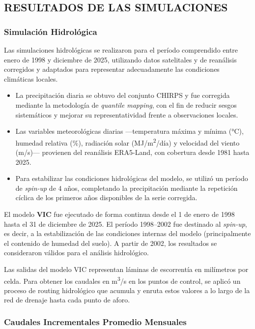 \subsection{RESULTADOS DE LAS SIMULACIONES}

\subsubsection{Simulación Hidrológica}
Las simulaciones hidrológicas se realizaron para el período comprendido entre
enero de 1998 y diciembre de 2025, utilizando datos satelitales y de reanálisis
corregidos y adaptados para representar adecuadamente las condiciones climáticas
locales.

\begin{itemize}[leftmargin=1.5em]
    \item La precipitación diaria se obtuvo del conjunto CHIRPS y fue corregida
    mediante la metodología de \textit{quantile mapping}, con el fin de reducir
    sesgos sistemáticos y mejorar su representatividad frente a observaciones
    locales.
    \item Las variables meteorológicas diarias —temperatura máxima y mínima
    (°C), humedad relativa (\%), radiación solar (MJ/m\textsuperscript{2}/día) y
    velocidad del viento (m/s)— provienen del reanálisis ERA5-Land, con
    cobertura desde 1981 hasta 2025.
    \item Para estabilizar las condiciones hidrológicas del modelo, se utilizó
    un período de \textit{spin-up} de 4 años, completando la precipitación
    mediante la repetición cíclica de los primeros años disponibles de la serie
    corregida.
\end{itemize}

El modelo \textbf{VIC} fue ejecutado de forma continua desde el 1 de enero de
1998 hasta el 31 de diciembre de 2025. El período 1998--2002 fue destinado al
\textit{spin-up}, es decir, a la estabilización de las condiciones internas del
modelo (principalmente el contenido de humedad del suelo). A partir de 2002, los
resultados se consideraron válidos para el análisis hidrológico.

Las salidas del modelo VIC representan láminas de escorrentía en milímetros por
celda. Para obtener los caudales en m\textsuperscript{3}/s en los puntos de
control, se aplicó un proceso de routing hidrológico que acumula y enruta estos
valores a lo largo de la red de drenaje hasta cada punto de aforo.

\subsubsection{Caudales Incrementales Promedio Mensuales}

